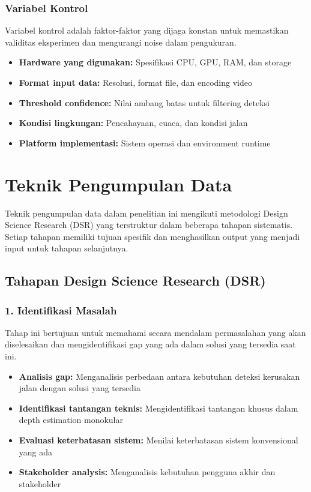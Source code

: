 \documentclass[12pt,a4paper]{report}
\begin{document}
\subsubsection{Variabel Kontrol}

Variabel kontrol adalah faktor-faktor yang dijaga konstan untuk memastikan validitas eksperimen dan mengurangi noise dalam pengukuran.

\begin{itemize}
    \item \textbf{Hardware yang digunakan:} Spesifikasi CPU, GPU, RAM, dan storage
    \item \textbf{Format input data:} Resolusi, format file, dan encoding video
    \item \textbf{Threshold confidence:} Nilai ambang batas untuk filtering deteksi
    \item \textbf{Kondisi lingkungan:} Pencahayaan, cuaca, dan kondisi jalan
    \item \textbf{Platform implementasi:} Sistem operasi dan environment runtime
\end{itemize}

\section{Teknik Pengumpulan Data}

Teknik pengumpulan data dalam penelitian ini mengikuti metodologi Design Science Research (DSR) yang terstruktur dalam beberapa tahapan sistematis. Setiap tahapan memiliki tujuan spesifik dan menghasilkan output yang menjadi input untuk tahapan selanjutnya.

\subsection{Tahapan Design Science Research (DSR)}

\subsubsection{1. Identifikasi Masalah}

Tahap ini bertujuan untuk memahami secara mendalam permasalahan yang akan diselesaikan dan mengidentifikasi gap yang ada dalam solusi yang tersedia saat ini.

\begin{itemize}
    \item \textbf{Analisis gap:} Menganalisis perbedaan antara kebutuhan deteksi kerusakan jalan dengan solusi yang tersedia
    \item \textbf{Identifikasi tantangan teknis:} Mengidentifikasi tantangan khusus dalam depth estimation monokular
    \item \textbf{Evaluasi keterbatasan sistem:} Menilai keterbatasan sistem konvensional yang ada
    \item \textbf{Stakeholder analysis:} Menganalisis kebutuhan pengguna akhir dan stakeholder
\end{itemize}
\end{document}
